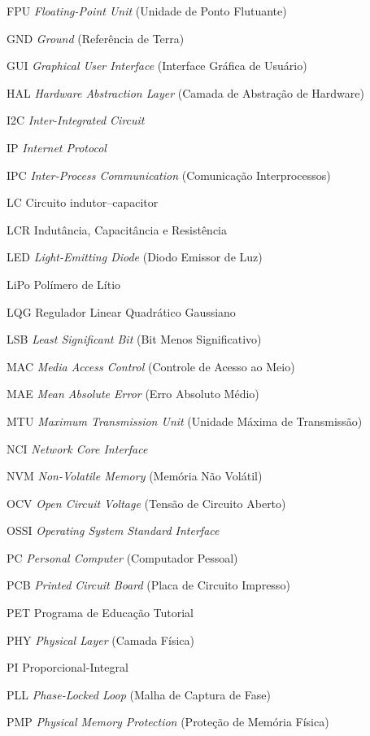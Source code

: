\begin{siglas}
	\item[FPU] \textit{Floating-Point Unit} (Unidade de Ponto Flutuante)
	\item[GND] \textit{Ground} (Referência de Terra)
	\item[GUI] \textit{Graphical User Interface} (Interface Gráfica de Usuário)
	\item[HAL] \textit{Hardware Abstraction Layer} (Camada de Abstração de Hardware)
	\item[I2C] \textit{Inter-Integrated Circuit}
	\item[IP] \textit{Internet Protocol}
	\item[IPC] \textit{Inter-Process Communication} (Comunicação Interprocessos)
	\item[LC] Circuito indutor--capacitor
	\item[LCR] Indutância, Capacitância e Resistência
	\item[LED] \textit{Light-Emitting Diode} (Diodo Emissor de Luz)
	\item[LiPo] Polímero de Lítio
	\item[LQG] Regulador Linear Quadrático Gaussiano
	\item[LSB] \textit{Least Significant Bit} (Bit Menos Significativo)
	\item[MAC] \textit{Media Access Control} (Controle de Acesso ao Meio)
	\item[MAE] \textit{Mean Absolute Error} (Erro Absoluto Médio)
	\item[MTU] \textit{Maximum Transmission Unit} (Unidade Máxima de Transmissão)
	\item[NCI] \textit{Network Core Interface}
	\item[NVM] \textit{Non-Volatile Memory} (Memória Não Volátil)
	\item[OCV] \textit{Open Circuit Voltage} (Tensão de Circuito Aberto)
	\item[OSSI] \textit{Operating System Standard Interface}
	\item[PC] \textit{Personal Computer} (Computador Pessoal)
	\item[PCB] \textit{Printed Circuit Board} (Placa de Circuito Impresso)
	\item[PET] Programa de Educação Tutorial
	\item[PHY] \textit{Physical Layer} (Camada Física)
	\item[PI] Proporcional-Integral
	\item[PLL] \textit{Phase-Locked Loop} (Malha de Captura de Fase)
	\item[PMP] \textit{Physical Memory Protection} (Proteção de Memória Física)

\end{siglas}
